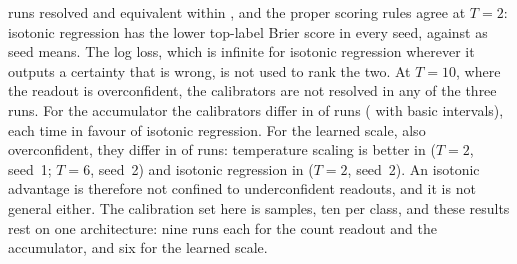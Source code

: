 \documentclass[10pt]{article}
\begin{document}
runs resolved and \tostNcCountBothBasicWide{} equivalent within \deltaWide, and the proper scoring %
rules agree at $T=2$: isotonic regression has the lower top-label Brier score in every seed, %
\brierNcTwoIso{} against \brierNcTwoTemp{} as seed means. The log loss, which is infinite for isotonic
regression wherever it outputs a certainty that is wrong, is not used to rank the two. At $T=10$, where the readout is overconfident, the calibrators are not resolved in any %
of the three runs. For the accumulator the calibrators differ in \ccAccumDiffer{} of \ccAccumRuns{} %
runs (\tostNcAccumDifferBasic{} with basic intervals), each time in favour of isotonic regression. %
For the learned scale, also overconfident, they differ in \ccScaledDiffer{} of \ccScaledRuns{} runs: %
temperature scaling is better in \ccScaledTemp{} ($T=2$, seed~1; $T=6$, seed~2) and isotonic %
regression in \ccScaledIso{} ($T=2$, seed~2). An isotonic advantage is therefore not confined to
underconfident readouts, and it is not general either. The calibration set here is \ccCalSize{} %
samples, ten per class, and these results rest on one architecture: nine runs each for the count
readout and the accumulator, and six for the learned scale.
\end{document}
